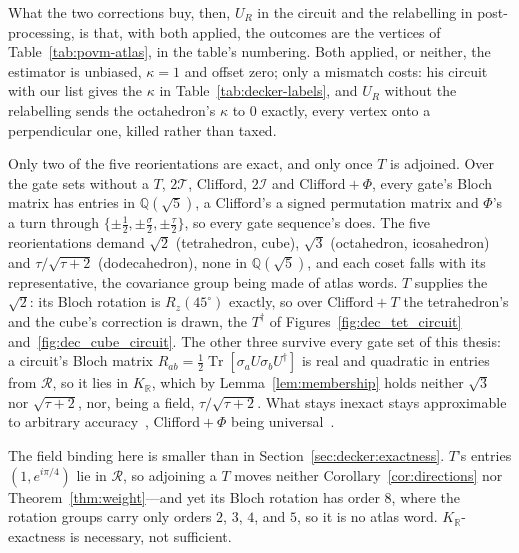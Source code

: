 \documentclass[11pt, oneside, openany]{scrbook}
\DeclareMathOperator{\Tr}{Tr}
\newcommand{\R}{\mathbb{R}}
\newcommand{\Tgroup}{\mathcal{T}}  %
\newcommand{\Igroup}{\mathcal{I}}  %
\newcommand{\TwoT}{2\Tgroup}
\newcommand{\TwoI}{2\Igroup}
\newcommand{\phig}{\tau} %
\newcommand{\invphig}{\sigma} %
\begin{document}


What the two corrections buy, then, $U_R$ in the circuit and the relabelling in post-processing, is that, with both applied, the outcomes are the vertices of Table~\ref{tab:povm-atlas}, in the table's numbering. Both applied, or neither, the estimator is unbiased, $\kappa = 1$ and offset zero; only a mismatch costs: his circuit with our list gives the $\kappa$ in Table~\ref{tab:decker-labels}, and $U_R$ without the relabelling sends the octahedron's $\kappa$ to $0$ exactly, every vertex onto a perpendicular one, killed rather than taxed.

Only two of the five reorientations are exact, and only once $T$ is adjoined. Over the gate sets without a $T$, $\TwoT$, Clifford, $\TwoI$ and Clifford${}+\Phi$, every gate's Bloch matrix has entries in $\mathbb{Q}(\sqrt{5})$, a Clifford's a signed permutation matrix and $\Phi$'s a turn through $\{\pm\tfrac{1}{2}, \pm\tfrac{\invphig}{2}, \pm\tfrac{\phig}{2}\}$, so every gate sequence's does. The five reorientations demand $\sqrt{2}$ (tetrahedron, cube), $\sqrt{3}$ (octahedron, icosahedron) and $\phig/\sqrt{\phig+2}$ (dodecahedron), none in $\mathbb{Q}(\sqrt{5})$, and each coset falls with its representative, the covariance group being made of atlas words. $T$ supplies the $\sqrt{2}$: its Bloch rotation is $R_z(45^\circ)$ exactly, so over Clifford${}+T$ the tetrahedron's and the cube's correction is drawn, the $T^\dagger$ of Figures~\ref{fig:dec_tet_circuit} and~\ref{fig:dec_cube_circuit}. The other three survive every gate set of this thesis: a circuit's Bloch matrix $R_{ab} = \tfrac{1}{2}\Tr[\sigma_a U \sigma_b U^\dagger]$ is real and quadratic in entries from $\mathcal{R}$, so it lies in $K_\R$, which by Lemma~\ref{lem:membership} holds neither $\sqrt{3}$ nor $\sqrt{\phig+2}$, nor, being a field, $\phig/\sqrt{\phig+2}$. What stays inexact stays approximable to arbitrary accuracy~\cite{blackman2022fastnavigationicosahedral,kliuchnikov2013asymptoticallyoptimalapproximation}, Clifford${}+\Phi$ being universal~\cite[Thm.~6.5]{nebe2000invariantscliffordgroups}.

The field binding here is smaller than in Section~\ref{sec:decker:exactness}. $T$'s entries $(1, e^{i\pi/4})$ lie in $\mathcal{R}$, so adjoining a $T$ moves neither Corollary~\ref{cor:directions} nor Theorem~\ref{thm:weight}---and yet its Bloch rotation has order $8$, where the rotation groups carry only orders $2$, $3$, $4$, and $5$, so it is no atlas word. $K_\R$-exactness is necessary, not sufficient.
\end{document}
